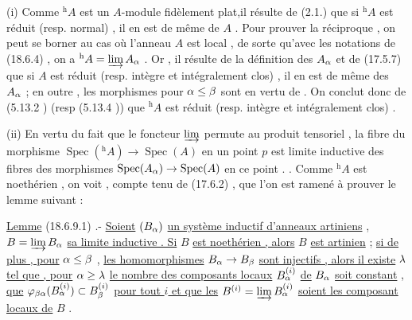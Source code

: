 (i) Comme $ {}^{\mathrm h}A$ est un $A$-module fidèlement plat,il résulte de (2.1.) que si
$ {}^{\mathrm h}A$ est  réduit (resp. normal) , il en est de même de $A$ . Pour prouver la
réciproque , on peut se borner au cas où l'anneau $A$ est local , de sorte 
qu'avec les notations de (18.6.4) , on a $ {}^{\mathrm h}A=\varinjlim A_{\alpha}$ . Or , il résulte de la
définition des $A_{\alpha}$ et de (17.5.7) que si $A$ est réduit (resp. intègre et intégralement
clos) , il en est de même des $A_{\alpha}$ ;  en outre , les  morphismes   pour $\alpha\leq\beta$
sont   en vertu de \inserted{\handwritten{\unsure{----}}} . On conclut donc de (5.13.2 ) (resp
(5.13.4 )) que $ {}^{\mathrm h}A$ est réduit (resp. intègre et intégralement clos) .

(ii)  En vertu du fait que le foncteur $\varinjlim$ permute au produit tensoriel ,
la fibre du morphisme $\operatorname{Spec}({}^{\mathrm h}A)\to\operatorname{Spec}(A)$ en un point $p$ est limite inductive
des fibres des morphismes $\operatorname{Spec}(A_{\alpha})\to\operatorname{Spec}(A)$ en ce point . . Comme $ {}^{\mathrm h}A$ est
noethérien , on voit , compte tenu de (17.6.2) , que l'on est ramené à prouver
le lemme suivant :

\uline{Lemme} (18.6.9.1) .- \uline{Soient}  $(B_{\alpha})$ \uline{un système inductif d'anneaux artiniens} ,
$B=\varinjlim B_{\alpha}$ \uline{sa limite inductive . Si} $B$ \uline{est noethérien , alors} $B$ \uline{est artinien} ;
 \uline{si de plus , pour} $\alpha\leq\beta$ , \uline{les
homomorphismes} \inserted{\handwritten{$\varphi_{\beta\alpha}:$}} $B_{\alpha}\to B_{\beta}$ \uline{sont injectifs , alors il existe} $\lambda$ \uline{tel que , pour} $\alpha\geq\lambda$
\uline{le nombre des composants locaux}  $B_{\alpha}^{(i)}$ \uline{de} $B_{\alpha}$ \uline{soit constant} , 
\uline{que} $\varphi_{\beta\alpha}(B_{\alpha}^{(i)})\subset B_{\beta}^{(i)}$ \uline{pour tout $i$ et que les} $B^{(i)}=\varinjlim B_{\alpha}^{(i)}$ \uline{soient les composant
locaux de} $B$ .

